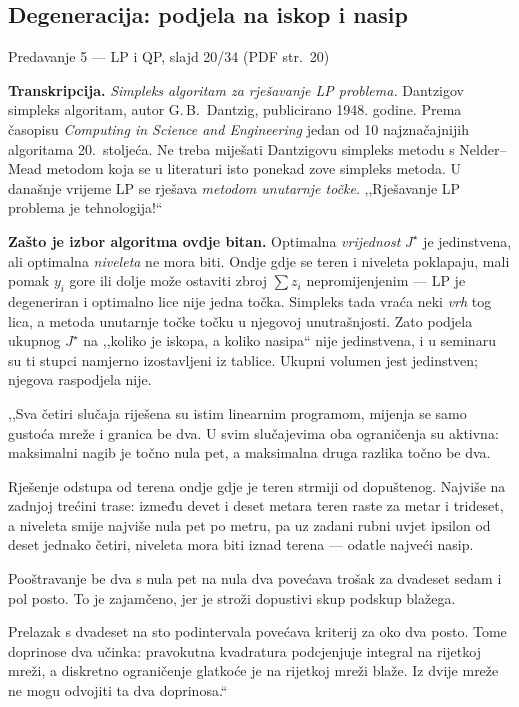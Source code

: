 \subsection{Degeneracija: podjela na iskop i nasip}
\label{sec:z3-degeneracija}

\begin{izvor}{Predavanje 5 --- LP i QP, slajd 20/34 (PDF str.~20)}

\textbf{Transkripcija.} \emph{Simpleks algoritam za rješavanje LP problema.}
Dantzigov simpleks algoritam, autor G.\,B.\ Dantzig, publicirano 1948. godine.
Prema časopisu \emph{Computing in Science and Engineering} jedan od 10
najznačajnijih algoritama 20.\ stoljeća. Ne treba miješati Dantzigovu simpleks
metodu s Nelder--Mead metodom koja se u literaturi isto ponekad zove simpleks
metoda. U današnje vrijeme LP se rješava \emph{metodom unutarnje točke}.
,,Rješavanje LP problema je tehnologija!``

\textbf{Zašto je izbor algoritma ovdje bitan.} Optimalna \emph{vrijednost}
$J^{\star}$ je jedinstvena, ali optimalna \emph{niveleta} ne mora biti. Ondje
gdje se teren i niveleta poklapaju, mali pomak $y_i$ gore ili dolje može ostaviti
zbroj $\sum z_i$ nepromijenjenim --- LP je degeneriran i optimalno lice nije
jedna točka. Simpleks tada vraća neki \emph{vrh} tog lica, a metoda unutarnje
točke točku u njegovoj unutrašnjosti. Zato podjela ukupnog $J^{\star}$ na
,,koliko je iskopa, a koliko nasipa`` nije jedinstvena, i u seminaru su ti stupci
namjerno izostavljeni iz tablice. Ukupni volumen jest jedinstven; njegova
raspodjela nije.
\end{izvor}

\begin{izgovor}
,,Sva četiri slučaja riješena su istim linearnim programom, mijenja se samo
gustoća mreže i granica be dva. U svim slučajevima oba ograničenja su aktivna:
maksimalni nagib je točno nula pet, a maksimalna druga razlika točno be dva.

Rješenje odstupa od terena ondje gdje je teren strmiji od dopuštenog. Najviše na
zadnjoj trećini trase: između devet i deset metara teren raste za metar i trideset,
a niveleta smije najviše nula pet po metru, pa uz zadani rubni uvjet ipsilon od
deset jednako četiri, niveleta mora biti iznad terena --- odatle najveći nasip.

Pooštravanje be dva s nula pet na nula dva povećava trošak za dvadeset sedam i
pol posto. To je zajamčeno, jer je stroži dopustivi skup podskup blažega.

Prelazak s dvadeset na sto podintervala povećava kriterij za oko dva posto.
Tome doprinose dva učinka: pravokutna kvadratura podcjenjuje integral na rijetkoj
mreži, a diskretno ograničenje glatkoće je na rijetkoj mreži blaže. Iz dvije
mreže ne mogu odvojiti ta dva doprinosa.``
\end{izgovor}
